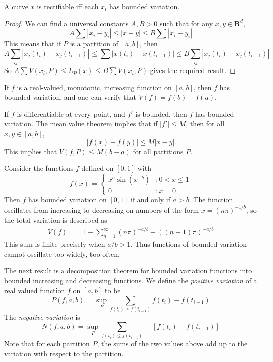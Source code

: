 \begin{theorem}
    A curve $x$ is rectifiable iff each $x_i$ has bounded variation.
\end{theorem}
\begin{proof}
    We can find a universal constants $A,B > 0$ such that for any $x,y \in \mathbf{R}^d$,
    \[ A \sum |x_i - y_i| \leq |x-y| \leq B \sum |x_i - y_i| \]
    This means that if $P$ is a partition of $[a,b]$, then
    \[ A \sum_{ij} |x_j(t_i) - x_j(t_{i-1})| \leq \sum |x(t_i) - x(t_{i-1})| \leq B \sum_{ij} |x_j(t_i) - x_j(t_{i-1})| \]
    So $A \sum V(x_i,P) \leq L_P(x) \leq B \sum V(x_i,P)$ gives the required result.
\end{proof}

\begin{example}
    If $f$ is a real-valued, monotonic, increasing function on $[a,b]$, then $f$ has bounded variation, and one can verify that $V(f) = f(b) - f(a)$.
\end{example}

\begin{example}
    If $f$ is differentiable at every point, and $f'$ is bounded, then $f$ has bounded variation. The mean value theorem implies that if $|f'| \leq M$, then for all $x,y \in [a,b]$,
    \[ |f(x) - f(y)| \leq M |x-y| \]
    This implies that $V(f,P) \leq M(b-a)$ for all partitions $P$.
\end{example}

\begin{example}
    Consider the functions $f$ defined on $[0,1]$ with
    \[ f(x) = \begin{cases} x^a \sin(x^{-b}) &: 0 < x \leq 1 \\ 0 &: x = 0 \end{cases} \]
    Then $f$ has bounded variation on $[0,1]$ if and only if $a > b$. The function oscillates from increasing to decreasing on numbers of the form $x = (n \pi)^{-1/b}$, so the total variation is described as
    \begin{align*}
      V(f) &= 1 + \sum_{n = 1}^\infty (n \pi)^{-a/b} + ((n+1) \pi)^{-a/b}
    \end{align*}
    This sum is finite precisely when $a/b > 1$. Thus functions of bounded variation cannot oscillate too widely, too often.
\end{example}

The next result is a decomposition theorem for bounded variation functions into bounded increasing and decreasing functions. We define the \emph{positive variation} of a real valued function $f$ on $[a,b]$ to be
%
\[ P(f,a,b) = \sup_P \sum_{f(t_i) \geq f(t_{i-1})} f(t_i) - f(t_{i-1}) \]
%
The \emph{negative variation} is
%
\[ N(f,a,b) = \sup_P \sum_{f(t_i) \leq f(t_{i-1})} -[f(t_i) - f(t_{i-1})] \]
%
Note that for each partition $P$, the sums of the two values above add up to the variation with respect to the partition.


